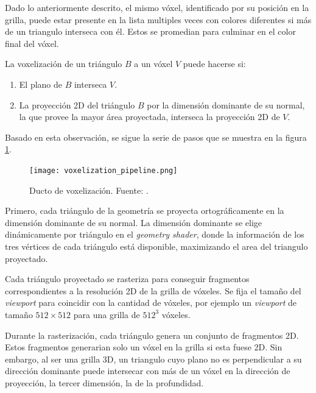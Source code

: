 Dado lo anteriormente descrito, el mismo vóxel, identificado por su posición en la grilla, puede estar presente en la lista multiples veces con colores diferentes si más de un triangulo interseca con él.
Estos se promedian para culminar en el color final del vóxel.

La voxelización de un triángulo $B$ a un vóxel $V$ puede hacerse si:

\begin{enumerate}
    \item El plano de $B$ interseca $V$.
    \item La proyección 2D del triángulo $B$ por la dimensión dominante de su normal, la que provee la mayor área proyectada, interseca la proyección 2D de $V$.
\end{enumerate}

Basado en esta observación, se sigue la serie de pasos que se muestra en la figura \ref{fig:voxelization_pipeline}.

\begin{figure}[h!]
    \centering
    \texttt{[image: voxelization\_pipeline.png]}
    \caption{Ducto de voxelización. Fuente: \cite{opengl-insights}.}
    \label{fig:voxelization_pipeline}
\end{figure}

Primero, cada triángulo de la geometría se proyecta ortográficamente en la dimensión dominante de su normal.
La dimensión dominante se elige dinámicamente por triángulo en el \textit{geometry shader}, donde la información de los tres vértices de cada triángulo está disponible,
maximizando el area del triangulo proyectado.

Cada triángulo proyectado se rasteriza para conseguir fragmentos correspondientes a la resolución 2D de la grilla de vóxeles.
Se fija el tamaño del \textit{viewport} para coincidir con la cantidad de vóxeles, por ejemplo un \textit{viewport} de tamaño $512\times512$ para una grilla de $512^3$ vóxeles.

Durante la rasterización, cada triángulo genera un conjunto de fragmentos 2D.
Estos fragmentos generarian solo un vóxel en la grilla si esta fuese 2D.
Sin embargo, al ser una grilla 3D, un triangulo cuyo plano no es perpendicular a su dirección dominante puede intersecar con más de un vóxel en la dirección de proyección, la tercer dimensión, la de la profundidad.

